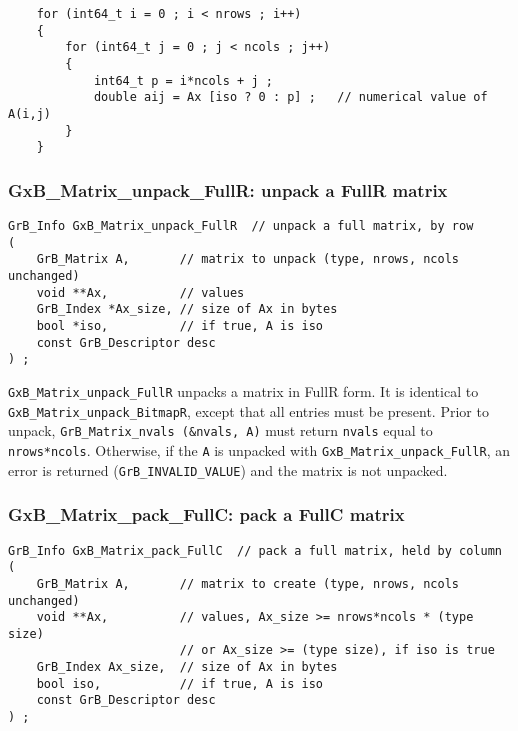 \documentclass[12pt]{article}
\begin{document}
{    \vspace{-0.1in}
    {\footnotesize
    \begin{verbatim}
    for (int64_t i = 0 ; i < nrows ; i++)
    {
        for (int64_t j = 0 ; j < ncols ; j++)
        {
            int64_t p = i*ncols + j ;
            double aij = Ax [iso ? 0 : p] ;   // numerical value of A(i,j)
        }
    } \end{verbatim}}

\subsubsection{{\sf GxB\_Matrix\_unpack\_FullR:} unpack a FullR matrix}
\label{matrix_unpack_fullr}

\begin{mdframed}[userdefinedwidth=6in]
{\footnotesize
\begin{verbatim}
GrB_Info GxB_Matrix_unpack_FullR  // unpack a full matrix, by row
(
    GrB_Matrix A,       // matrix to unpack (type, nrows, ncols unchanged)
    void **Ax,          // values
    GrB_Index *Ax_size, // size of Ax in bytes
    bool *iso,          // if true, A is iso
    const GrB_Descriptor desc
) ;
\end{verbatim}
} \end{mdframed}

\verb'GxB_Matrix_unpack_FullR' unpacks a matrix in FullR form.  It is identical
to \verb'GxB_Matrix_unpack_BitmapR', except that all entries must be present.
Prior to unpack, \verb'GrB_Matrix_nvals (&nvals, A)' must return
\verb'nvals' equal to \verb'nrows*ncols'.  Otherwise, if the \verb'A' is
unpacked with \newline \verb'GxB_Matrix_unpack_FullR', an error is returned
(\verb'GrB_INVALID_VALUE') and the matrix is not unpacked.

\subsubsection{{\sf GxB\_Matrix\_pack\_FullC:} pack a FullC matrix}
\label{matrix_pack_fullc}

\begin{mdframed}[userdefinedwidth=6in]
{\footnotesize
\begin{verbatim}
GrB_Info GxB_Matrix_pack_FullC  // pack a full matrix, held by column
(
    GrB_Matrix A,       // matrix to create (type, nrows, ncols unchanged)
    void **Ax,          // values, Ax_size >= nrows*ncols * (type size)
                        // or Ax_size >= (type size), if iso is true
    GrB_Index Ax_size,  // size of Ax in bytes
    bool iso,           // if true, A is iso
    const GrB_Descriptor desc
) ;
\end{verbatim}
} \end{mdframed}

}
\end{document}
